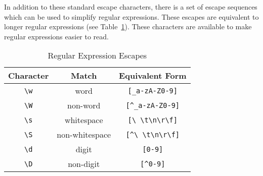 In addition to these standard escape characters, there is a set of escape sequences
which can be used to simplify regular expressions. These escapes are equivalent to
longer regular expressions (see Table~\ref{escape-regx}). These characters are
available to make regular expressions easier to read.
\begin{table}[tbh]
\begin{center}
\begin{tabular}{|c|c|c|}
\hline
Character & Match & Equivalent Form\\
\hline
\hline
\verb-\w-    & word & \verb|[_a-zA-Z0-9]| \\ \hline
\verb-\W-    & non-word & \verb|[^_a-zA-Z0-9]| \\ \hline
\verb-\s-    & whitespace & \verb|[\ \t\n\r\f]| \\ \hline
\verb-\S-    & non-whitespace & \verb|[^\ \t\n\r\f]| \\ \hline
\verb-\d-    & digit & \verb|[0-9]| \\ \hline
\verb-\D-    & non-digit & \verb|[^0-9]| \\ \hline
\end{tabular}
\end{center}

\caption{ Regular Expression Escapes }
\label{escape-regx}
\end{table}



